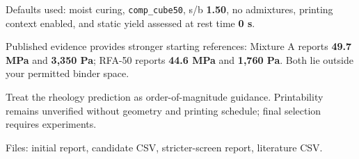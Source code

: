 \begin{agentbox}
\par
Defaults used: moist curing, \texttt{comp\_cube50}, s/b \textbf{1.50}, no admixtures, printing context enabled, and static yield assessed at rest time \textbf{0 s}.\par
\par
Published evidence provides stronger starting references: Mixture A reports \textbf{49.7 MPa} and \textbf{3,350 Pa}; RFA-50 reports \textbf{44.6 MPa} and \textbf{1,760 Pa}. Both lie outside your permitted binder space.\par
\par
Treat the rheology prediction as order-of-magnitude guidance. Printability remains unverified without geometry and printing schedule; final selection requires experiments.\par
\par
Files: initial report, candidate CSV, stricter-screen report, literature CSV.\par
\par
\end{agentbox}